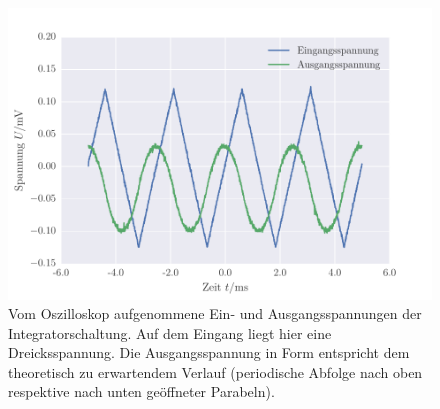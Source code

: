 \FloatBarrier
\begin{figure}[!h]
\centering
\includegraphics[scale=0.75]{../Grafiken/Integrator_Oszilloskop_Dreieck.pdf}
\caption{Vom Oszilloskop aufgenommene Ein- und Ausgangsspannungen der Integratorschaltung. Auf dem Eingang
	liegt hier eine Dreicksspannung. Die Ausgangsspannung in Form entspricht dem theoretisch
	zu erwartendem Verlauf (periodische Abfolge nach oben respektive nach unten geöffneter 
	Parabeln).\label{fig:integrator_oszilloskop_dreieck}}
\end{figure}
\FloatBarrier
